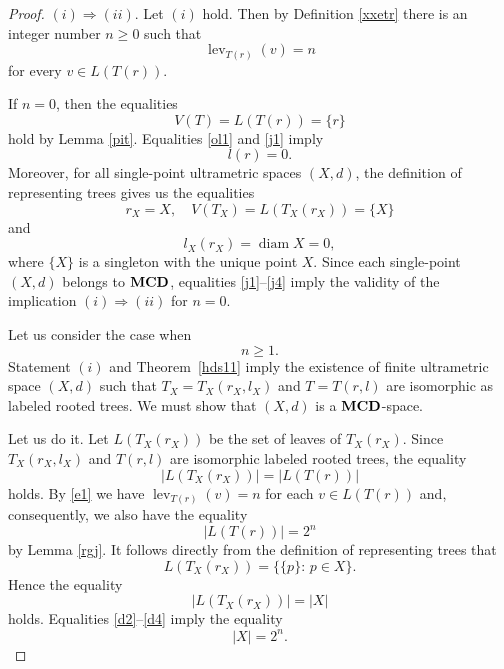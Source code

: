 \documentclass{raex}
\theoremstyle{definition}
\theoremstyle{remark}
\numberwithin{equation}{section}
\begin{document}
\begin{proof} 
 $(i)\Rightarrow(ii)$.
Let $(i)$ hold. Then by Definition \ref{xxetr} there is
an integer number $n\geq 0$ such that
\begin{equation}
\label{e1}
\operatorname{lev}_{T(r)}(v)=n
\end{equation}
for every $v\in L(T(r))$.

If $n=0$, then the equalities
\begin{equation}\label{j1}
V(T)=L(T(r))=\{r\}
\end{equation}
hold by Lemma \ref{pit}. Equalities \eqref{ol1} and \eqref{j1} imply 
\begin{equation*}
l(r)=0.
\end{equation*}
Moreover, for all single-point ultrametric spaces $(X,d)$, the definition of representing trees gives us the equalities
\begin{equation*}
r_X=X, \quad
V(T_X)=L(T_X(r_X))=\{X\}
\end{equation*}
and
\begin{equation}\label{j4}
l_X(r_X)=\operatorname{diam} X=0,
\end{equation}
where $\{X\}$ is a singleton with the unique point $X$.
Since each single-point $(X,d)$ belongs to ${\bf MCD}$, equalities \eqref{j1}--\eqref{j4} imply the validity of the implication
\(
(i)\Rightarrow(ii) 
\) for $n=0$.

Let us consider the case when 
\begin{equation}
    \label{ccc}
    n\geq 1.
\end{equation}
Statement $(i)$ and Theorem~\ref{hds11} imply the existence of finite ultrametric space $(X,d)$ such that
\(
T_X=T_X(r_X,l_X)
\)
and
\(
T=T(r,l)
\)
are isomorphic as labeled rooted trees. We must show that $(X,d)$ is a ${\bf MCD}$-space.

Let us do it. 
 Let  \(L(T_X(r_X))\) be the set of leaves of \( T_X(r_X)\). Since $T_X(r_X,l_X)$ and $T(r,l)$ are isomorphic labeled rooted trees, the equality
\begin{equation}\label{d2}
|L(T_X(r_X))|=|L(T(r))|
\end{equation}
holds.
By \eqref{e1} we have $\operatorname{lev}_{T(r)}(v)=n$ for each  $v \in L(T(r))$ and, consequently,
 we also have the equality
\begin{equation*}
|L\!\left(T(r)\right)|=2^n
\end{equation*}
by Lemma \ref{rgj}.
It follows directly from the definition of representing trees that
\begin{equation*}%
L\!\left(T_X(r_X)\right)=\{\{p\}:\, p\in X\}.
\end{equation*}
Hence the equality 
\begin{equation}\label{d4}
|L\!\left(T_X(r_X)\right)|=|X|
\end{equation}
holds.
Equalities \eqref{d2}--\eqref{d4} imply the  equality
\begin{equation}
    \label{ol2}
|X|=2^n.
\end{equation}


\end{proof}
\end{document}
